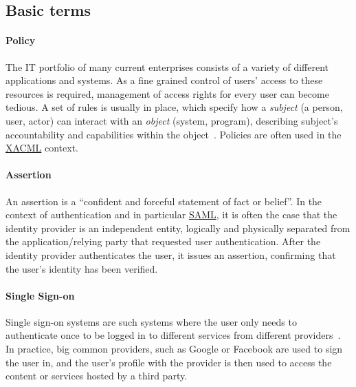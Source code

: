 \subsection{Basic terms}\label{sec:basic-terms}

\paragraph{Policy}
The IT portfolio of many current enterprises consists of a variety of different applications and systems. As a fine grained control of users' access to these resources is required, management of access rights for every user can become tedious. A set of rules is usually in place, which specify how a \textit{subject} (a person, user, actor) can interact with an \textit{object} (system, program), describing subject's accountability and capabilities within the object~\cite{Feltus2008PreliminaryConcept}. Policies are often used in the \hyperref[sec:xacml]{XACML} context.

\paragraph{Assertion}
An assertion is a ``confident and forceful statement of fact or belief''\footnotemark. In the context of authentication and in particular \hyperref[sec:saml]{SAML}, it is often the case that the identity provider is an independent entity, logically and physically separated from the application/relying party that requested user authentication. After the identity provider authenticates the user, it issues an assertion, confirming that the user's identity has been verified.


\paragraph{Single Sign-on}
Single sign-on systems are such systems where the user only needs to authenticate once to be logged in to different services from different providers~\cite{Suoranta2014LogoutSolutions}. In practice, big common providers, such as Google or Facebook are used to sign the user in, and the user's profile with the provider is then used to access the content or services hosted by a third party.

